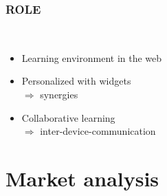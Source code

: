\begin{frame}
  \frametitle{ROLE}
      \begin{description}[]
        \item[ROLE (Responsive Open Learning Environments)] \hfill \\
        \begin{itemize}
          \item Learning environment in the web
          \item Personalized with widgets\\ $\Rightarrow$ synergies
          \item Collaborative learning\\ $\Rightarrow$ inter-device-communication
        \end{itemize}
      \end{description}
\end{frame}


\section{Market analysis}

